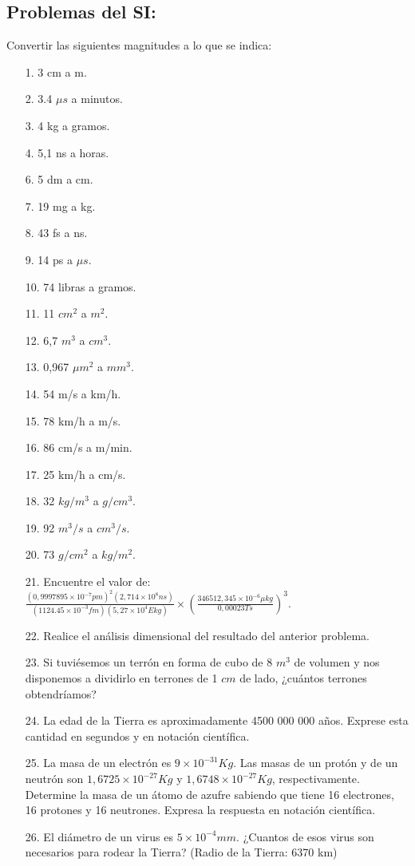 \documentclass[a5paper,pagesize,10pt,bibtotoc,pointlessnumbers,
normalheadings,DIV=9,fleqn,x11names,table,twoside=false]{scrbook}
\begin{document}
\subsection{Problemas del SI:}

Convertir las siguientes magnitudes a lo que se indica:
\begin{itemize}
 \item[1.] 3 cm a m.
 \item[2.] 3.4 $\mu s$ a minutos.
 \item[3.] 4 kg a gramos.
 \item[4.] 5,1 ns a horas.
 \item[6.] 5 dm a cm.
 \item[7.] 19 mg a kg.
 \item[8.] 43 fs a ns.
 \item[9.] 14 ps a $\mu s$.
 \item[10.] 74 libras a gramos.
 \item[11.] 11 $cm^2$ a $m^2$.
 \item[12.] 6,7 $m^3$ a $cm^3$.
 \item[13.] 0,967 $\mu m^2$ a $mm^3$.
 \item[14.] 54 m/s a km/h.
 \item[15.] 78 km/h a m/s.
 \item[16.] 86 cm/s a m/min.
 \item[17.] 25 km/h a cm/s.
 \item[18.] 32 $kg/m^3$ a $g/cm^3$.
 \item[19.] 92 $m^3/s$ a $cm^3/s$.
 \item[20.] 73 $g/cm^2$ a $kg/m^2$.
 \item[21.] Encuentre el valor de:\\
 $\frac{(0,9997895\times 10^{-7}pm)^2(2,714\times 10^8 ns)}{(1124.45\times 10^{-3} fm)(5,27\times 10^4 Ekg)}\times 
\left(\frac{346512,345\times 10^{-6} \mu kg}{0,00023 Ts}\right)^3$.
 \item[22.] Realice el análisis dimensional del resultado del anterior problema.
\item[23.] Si tuviésemos un terrón en forma de cubo de 8 $m^3$ de volumen y nos disponemos a dividirlo en terrones de 1 $cm$ de 
lado, ¿cuántos terrones obtendríamos?
\item[24.] La edad de la Tierra es aproximadamente 4500 000 000 años. Exprese esta cantidad en segundos y en notación
científica.
\item[25.] La masa de un electrón es $9 \times 10
^{-31}Kg$. Las masas de un
 protón y de un neutrón son $1,6725 \times 10
^{
-27} Kg$ y $1,6748 \times 10
^{-27} Kg$, respectivamente.
 Determine la masa de un átomo de azufre sabiendo que tiene 16 
electrones, 16 protones y
 16 neutrones. Expresa la respuesta en notación científica.

\item[26.] El
 diámetro de un virus es $5 \times 10^{-4} mm$. ¿Cuantos de esos virus son necesarios para rodear
 la Tierra? 
(Radio de la Tierra: 6370 km) 

 \end{itemize}
\end{document}

